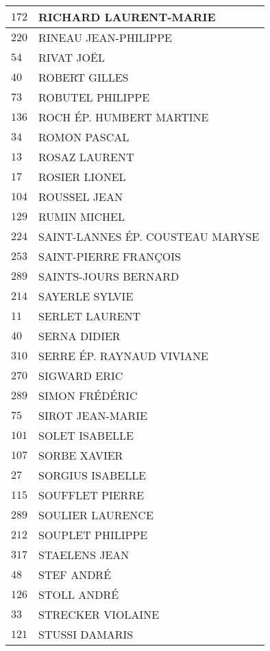 \begin{xltabular}{\linewidth}{|l|X|}
    \hline
    $172$ & RICHARD LAURENT-MARIE \\
    \hline
    $220$ & RINEAU JEAN-PHILIPPE \\
    \hline
    $54$ & RIVAT JOËL \\
    \hline
    $40$ & ROBERT GILLES \\
    \hline
    $73$ & ROBUTEL PHILIPPE \\
    \hline
    $136$ & ROCH ÉP. HUMBERT MARTINE \\
    \hline
    $34$ & ROMON PASCAL \\
    \hline
    $13$ & ROSAZ LAURENT \\
    \hline
    $17$ & ROSIER LIONEL \\
    \hline
    $104$ & ROUSSEL JEAN \\
    \hline
    $129$ & RUMIN MICHEL \\
    \hline
    $224$ & SAINT-LANNES ÉP. COUSTEAU MARYSE \\
    \hline
    $253$ & SAINT-PIERRE FRANÇOIS \\
    \hline
    $289$ & SAINTS-JOURS BERNARD \\
    \hline
    $214$ & SAYERLE SYLVIE \\
    \hline
    $11$ & SERLET LAURENT \\
    \hline
    $40$ & SERNA DIDIER \\
    \hline
    $310$ & SERRE ÉP. RAYNAUD VIVIANE \\
    \hline
    $270$ & SIGWARD ERIC \\
    \hline
    $289$ & SIMON FRÉDÉRIC \\
    \hline
    $75$ & SIROT JEAN-MARIE \\
    \hline
    $101$ & SOLET ISABELLE \\
    \hline
    $107$ & SORBE XAVIER \\
    \hline
    $27$ & SORGIUS ISABELLE \\
    \hline
    $115$ & SOUFFLET PIERRE \\
    \hline
    $289$ & SOULIER LAURENCE \\
    \hline
    $212$ & SOUPLET PHILIPPE \\
    \hline
    $317$ & STAELENS JEAN \\
    \hline
    $48$ & STEF ANDRÉ \\
    \hline
    $126$ & STOLL ANDRÉ \\
    \hline
    $33$ & STRECKER VIOLAINE \\
    \hline
    $121$ & STUSSI DAMARIS \\

\end{xltabular}
